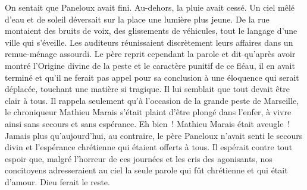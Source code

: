 \documentclass[french,twoside]{book} %
\begin{document}
On sentait que Paneloux avait fini. Au-dehors, la pluie avait cessé. Un ciel mêlé d’eau et de soleil déversait sur la place une lumière plus jeune. De la rue montaient des bruits de voix, des glissements de véhicules, tout le langage d’une ville qui s’éveille. Les auditeurs réunissaient discrètement leurs affaires dans un remue-ménage assourdi. Le père reprit cependant la parole et dit qu’après avoir montré l’Origine divine de la peste et le caractère punitif de ce fléau, il en avait terminé et qu’il ne ferait pas appel pour sa conclusion à une éloquence qui serait déplacée, touchant une matière si tragique. Il lui semblait que tout devait être clair à tous. Il rappela seulement qu’à l’occasion de la grande peste de Marseille, le chroniqueur Mathieu Marais s’était plaint d’être plongé dans l’enfer, à vivre ainsi sans secours et sans espérance. Eh bien ! Mathieu Marais était aveugle ! Jamais plus qu’aujourd’hui, au contraire, le père Paneloux n’avait senti le secours divin et l’espérance chrétienne qui étaient offerts à tous. Il espérait contre tout espoir que, malgré l’horreur de ces journées et les cris des agonisants, nos concitoyens adresseraient au ciel la seule parole qui fût chrétienne et qui était d’amour. Dieu ferait le reste.
\end{document}
